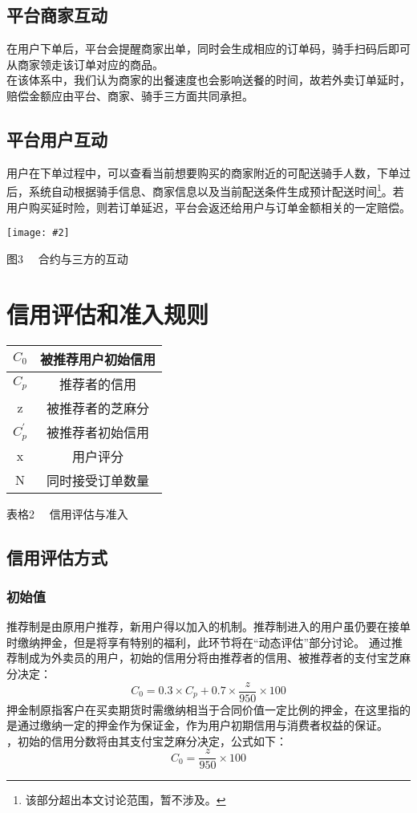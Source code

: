\documentclass[UTF8]{ctexart}
\newcommand\picturehere[2][1]{\centerline{\texttt{[image: \#2]}}}
\newcommand\picfig[1]{\centerline{\small \heiti #1 \songti }}
\begin{document}
\begin{multicols}{2}
  \subsection{平台商家互动}
  \indent 在用户下单后，平台会提醒商家出单，同时会生成相应的订单码，骑手扫码后即可从商家领走该订单对应的商品。\\
  \indent 在该体系中，我们认为商家的出餐速度也会影响送餐的时间，故若外卖订单延时，赔偿金额应由平台、商家、骑手三方面共同承担。
  \subsection{平台用户互动}
  \indent 用户在下单过程中，可以查看当前想要购买的商家附近的可配送骑手人数，下单过后，系统自动根据骑手信息、商家信息以及当前配送条件生成预计配送时间\footnote{该部分超出本文讨论范围，暂不涉及。}。若用户购买延时险，则若订单延迟，平台会返还给用户与订单金额相关的一定赔偿。
  \picturehere[0.5]{image/contract.png}
  \picfig{图3 \ \ 合约与三方的互动}



  \section{信用评估和准入规则}
  \begin{table}[H]
    \centering
    \begin{tabular}{|c|c|}
      \hline
      $C_0$ & 被推荐用户初始信用 \\ \hline
      $C_p$ & 推荐者的信用 \\ \hline
      z &被推荐者的芝麻分\footnotemark[2]\\ \hline
      $C_p^{'}$ & 被推荐者初始信用 \\ \hline
      x & 用户评分 \\ \hline
      N & 同时接受订单数量 \\ \hline
    \end{tabular}
  \end{table}
  \picfig{表格2 \ \ 信用评估与准入}
  \subsection{信用评估方式}
  \subsubsection{初始值}
  \indent 推荐制是由原用户推荐，新用户得以加入的机制。推荐制进入的用户虽仍要在接单时缴纳押金，但是将享有特别的福利，此环节将在“动态评估”部分讨论。
  \indent 通过推荐制成为外卖员的用户，初始的信用分将由推荐者的信用、被推荐者的支付宝芝麻分决定：
  $$C_0=0.3\times C_p + 0.7 \times \frac{z}{950} \times 100$$
  \indent 押金制原指客户在买卖期货时需缴纳相当于合同价值一定比例的押金，在这里指的是通过缴纳一定的押金作为保证金，作为用户初期信用与消费者权益的保证。\\
  ，初始的信用分数将由其支付宝芝麻分决定，公式如下：
  $$C_0=\frac{z}{950} \times 100$$

\end{multicols}
\end{document}
